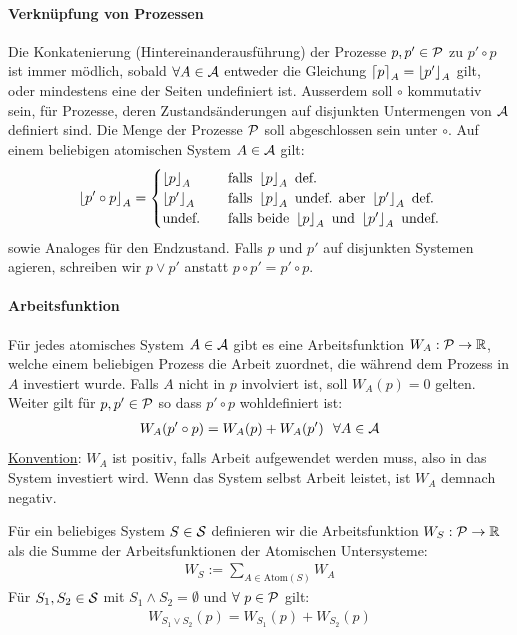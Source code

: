 \paragraph{Verknüpfung von Prozessen}
Die Konkatenierung (Hintereinanderausführung) der Prozesse $p,p' \in \P$
zu $p' \circ p$ ist immer mödlich, sobald $\forall A \in \A$ entweder die
Gleichung $\ceil{p}_A = \floor{p'}_A$ gilt, oder mindestens eine der
Seiten undefiniert ist. Ausserdem soll $\circ$ kommutativ sein, für
Prozesse, deren Zustandsänderungen auf disjunkten Untermengen von $\A$
definiert sind. Die Menge der Prozesse $\P$ soll abgeschlossen sein unter
$\circ$. Auf einem beliebigen atomischen System $A \in \A$ gilt:
\begin{align*}
    \floor{p' \circ p}_A = \begin{cases}
        \floor{p}_A \hspace{10pt} &\text{falls } \floor{p}_A \text{ def.}
        \\
        \floor{p'}_A \hspace{10pt} &\text{falls } \floor{p}_A \text{ undef. aber } \floor{p'}_A \text{ def.}
        \\
        \text{undef.} \hspace{10pt} &\text{falls beide } \floor{p}_A \text{ und } \floor{p'}_A \text{ undef.}
    \end{cases}
\end{align*}
sowie Analoges für den Endzustand. Falls $p$ und $p'$ auf disjunkten Systemen
agieren, schreiben wir $p \vee p'$ anstatt $p \circ p' = p' \circ p$.


\paragraph{Arbeitsfunktion}
Für jedes atomisches System $A \in \A$ gibt es eine Arbeitsfunktion
$W_A : \P \rightarrow \R$, welche einem beliebigen Prozess die Arbeit zuordnet,
die während dem Prozess in $A$ investiert wurde. Falls $A$ nicht in $p$
involviert ist, soll $W_A (p) = 0$ gelten. Weiter gilt für $p,p' \in \P$
so dass $p' \circ p$ wohldefiniert ist:
\begin{align*}
    W_A (p' \circ p) = W_A (p) + W_A (p') \ \ \forall A \in \A
\end{align*}
\underline{Konvention}: $W_A$ ist positiv, falls Arbeit aufgewendet werden
muss, also in das System investiert wird. Wenn das System selbst Arbeit
leistet, ist $W_A$ demnach negativ.

\begin{definition}
    Für ein beliebiges System $S \in \S$ definieren wir die Arbeitsfunktion
    $W_S : \P \rightarrow \R$ als die Summe der Arbeitsfunktionen der
    Atomischen Untersysteme:
    \begin{align*}
        W_S := \sum_{A \in \text{Atom}(S)} W_A
    \end{align*}
    Für $S_1,S_2 \in \S$ mit $S_1 \wedge S_2 = \emptyset$ und $\forall \ 
    p \in \P$ gilt:
    \begin{align*}
        W_{S_1 \vee S_2} (p) = W_{S_1} (p) + W_{S_2} (p)
    \end{align*}
\end{definition}

